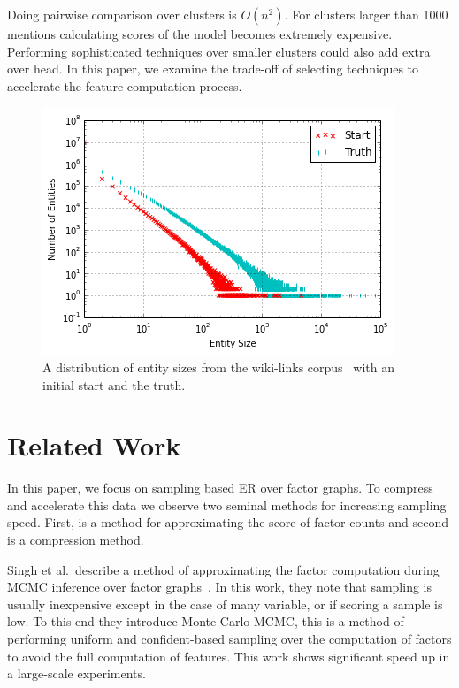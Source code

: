 Doing pairwise comparison over clusters is $O(n^2)$.
For clusters larger than 1000 mentions calculating scores of the model
becomes extremely expensive.
Performing sophisticated techniques over smaller clusters could also 
add extra over head.
In this paper, we examine the trade-off of selecting techniques to
accelerate the feature computation process.


\begin{figure}
\centering
\includegraphics[width=\columnwidth]{media/start-vs-nd.png}
\caption{A distribution of entity sizes from the wiki-links corpus~\cite{singh12:wiki-links} with an initial start and the truth.}
\label{fig:entity-distribution}
\end{figure}



\section{Related Work}
\label{sec:optimizer:relatedwork}

In this paper, we focus on sampling based ER over factor graphs.
To compress and accelerate this data we observe two seminal methods for
increasing sampling speed.
First, is a method for approximating the score of factor counts and second is
a compression method.

Singh et al.\ describe a method of approximating the factor computation during MCMC
inference over factor graphs~\cite{singh2011large}.
In this work, they note that sampling is usually inexpensive except in the case
of many variable, or if scoring a sample is low. To this end they introduce Monte
Carlo MCMC, this is a method of performing uniform and confident-based sampling
over the computation of factors to avoid the full computation of features.
This work shows significant speed up in a large-scale experiments.

